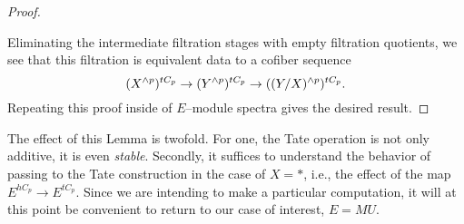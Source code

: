 \begin{proof}
\begin{center}
\end{center}
Eliminating the intermediate filtration stages with empty filtration quotients, we see that this filtration is equivalent data to a cofiber sequence \[(X^{\wedge p})^{tC_p} \to (Y^{\wedge p})^{tC_p} \to ((Y/X)^{\wedge p})^{tC_p}.\]  Repeating this proof inside of \(E\)--module spectra gives the desired result.
\end{proof}

The effect of this Lemma is twofold.  For one, the Tate operation is not only additive, it is even \emph{stable}.  Secondly, it suffices to understand the behavior of passing to the Tate construction in the case of \(X = *\), i.e., the effect of the map \(E^{hC_p} \to E^{tC_p}\).  Since we are intending to make a particular computation, it will at this point be convenient to return to our case of interest, \(E = MU\).

